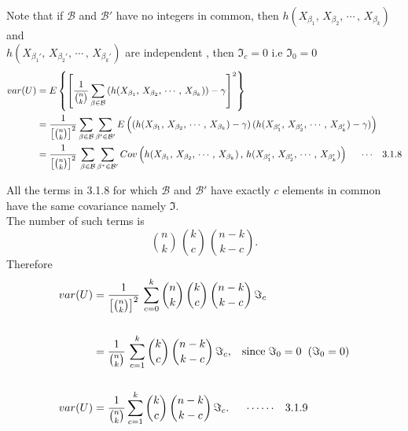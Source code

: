 \documentclass[12pt,a4paper]{report}
\theoremstyle{definition}
\theoremstyle{plain}
\begin{document}
Note that if $\mathcal{B}$ and $\mathcal{B}'$ have no integers in common, then  $h(X_{\beta_1}, \, X_{\beta_2}, \, \cdots\, , \, X_{\beta_k})$ and\\ $h(X_{\beta_1'}, \, X_{\beta_2'}, \, \cdots\, , \, X_{\beta_k'})$ are independent , then $\Im_c = 0$ i.e $\Im_0  = 0$
\begin{align*}
var(U) & = E\left\{\left[\frac{1}{\binom{n}{k}}\sum_{\beta\in\mathcal{B}}\left(h(X_{\beta_1}, \, X_{\beta_2}, \, \cdots\, , \, X_{\beta_k})\right) - \gamma\right]^2\right\}\\
& = \frac{1}{\left[\binom{n}{k}\right]^2}\sum_{\beta\in\mathcal{B}}\sum_{\beta'\in\mathcal{B}'}E\left((h(X_{\beta_1}, \, X_{\beta_2}, \, \cdots\, , \, X_{\beta_k})-\gamma)\, (h(X_{\beta_1'}, \, X_{\beta_2'}, \, \cdots\, , \, X_{\beta_k'}) - \gamma)\right)\\
& = \frac{1}{\left[\binom{n}{k}\right]^2}\, \sum_{\beta\in \mathcal{B}}\sum_{\beta^*\in\mathcal{B}'}Cov\left(h(X_{\beta_1}, \, X_{\beta_2}, \, \cdots\, , \, X_{\beta_k})\, , \, h(X_{\beta_1'}, \, X_{\beta_2'}, \, \cdots\, , \, X_{\beta_k'})\right)\hspace*{0.5cm}\cdots\hspace{0.3cm} 3.1.8
\end{align*}















All the terms in 3.1.8 for which $\mathcal{B}$ and $\mathcal{B}'$ have exactly $c$ elements in common have the same covariance namely $\Im$.\\
The number of such terms is $$\binom{n}{k}\, \binom{k}{c}\,\binom{n - k}{k - c}.$$
Therefore
\begin{align*}
var(U) &  = \frac{1}{\left[\binom{n}{k}\right]^2}\, \sum^k_{c = 0} \binom{n}{k}\,\binom{k}{c}\, \binom{n - k}{k-c}\, \Im_c\\\\
& = \frac{1}{\binom{n}{k}}\, \sum^k_{c = 1}\binom{k}{c}\, \binom{n - k}{k - c}\, \Im_c, \hspace{0.3cm} \text{since}\hspace{0.1cm} \Im_0 = 0\hspace{0.2cm} (\Im_0 = 0)\\\\
var(U) & = \frac{1}{\binom{n}{k}}\sum^k_{c = 1} \binom{k}{c}\, \binom{n - k}{k - c}\, \Im_c.\hspace{0.5cm}\cdots\cdots\hspace{0.3cm} 3.1.9
\end{align*}
\end{document}
